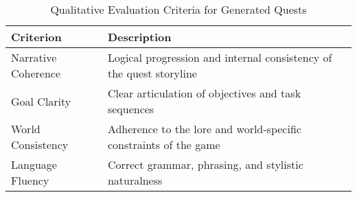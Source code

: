 \begin{table}[H]
  \centering
  \scriptsize
  \renewcommand{\arraystretch}{1.3}
  \begin{tabularx}{0.95\textwidth}{
    >{\raggedright\arraybackslash}p{5cm}
    >{\raggedright\arraybackslash}X
  }
    \toprule
    \textbf{Criterion} & \textbf{Description} \\
    \midrule
    Narrative Coherence & Logical progression and internal consistency of the quest storyline \\
    Goal Clarity & Clear articulation of objectives and task sequences \\
    World Consistency & Adherence to the lore and world-specific constraints of the game \\
    Language Fluency & Correct grammar, phrasing, and stylistic naturalness \\
    \bottomrule
  \end{tabularx}
  \caption{Qualitative Evaluation Criteria for Generated Quests}
\end{table}

\newpage
